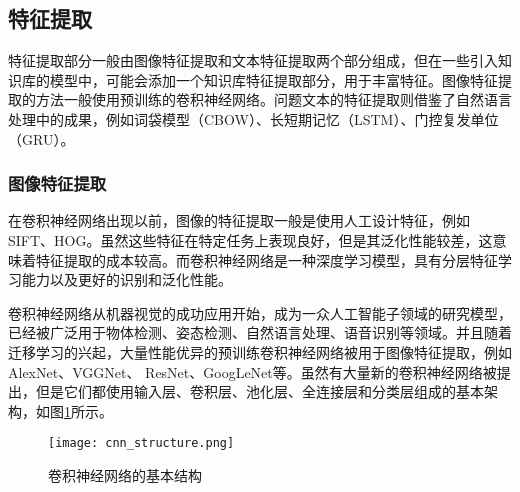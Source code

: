
\subsection{特征提取}
特征提取部分一般由图像特征提取和文本特征提取两个部分组成，但在一些引入知识库的模型中，可能会添加一个知识库特征提取部分，用于丰富特征。图像特征提取的方法一般使用预训练的卷积神经网络。问题文本的特征提取则借鉴了自然语言处理中的成果，例如词袋模型（CBOW）、长短期记忆（LSTM）、门控复发单位（GRU）。

\subsubsection{图像特征提取}
在卷积神经网络出现以前，图像的特征提取一般是使用人工设计特征，例如SIFT、HOG。虽然这些特征在特定任务上表现良好，但是其泛化性能较差，这意味着特征提取的成本较高。而卷积神经网络是一种深度学习模型，具有分层特征学习能力以及更好的识别和泛化性能。

卷积神经网络从机器视觉的成功应用开始，成为一众人工智能子领域的研究模型，已经被广泛用于物体检测、姿态检测、自然语言处理、语音识别等领域。并且随着迁移学习的兴起，大量性能优异的预训练卷积神经网络被用于图像特征提取，例如AlexNet、VGGNet、 ResNet、GoogLeNet等。虽然有大量新的卷积神经网络被提出，但是它们都使用输入层、卷积层、池化层、全连接层和分类层组成的基本架构，如图\ref{cnn_structure}所示。
\begin{figure}[H]
	\centering
	\texttt{[image: cnn\_structure.png]}
	\caption{卷积神经网络的基本结构}
	\label{cnn_structure}
\end{figure}

